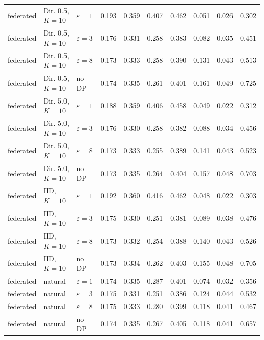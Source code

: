 {\begin{longtable}{lllrrrrrrr}
federated & Dir. 0.5, $K{=}10$ & $\varepsilon=1$ & 0.193 & 0.359 & 0.407 & 0.462 & 0.051 & 0.026 & 0.302 \\
federated & Dir. 0.5, $K{=}10$ & $\varepsilon=3$ & 0.176 & 0.331 & 0.258 & 0.383 & 0.082 & 0.035 & 0.451 \\
federated & Dir. 0.5, $K{=}10$ & $\varepsilon=8$ & 0.173 & 0.333 & 0.258 & 0.390 & 0.131 & 0.043 & 0.513 \\
federated & Dir. 0.5, $K{=}10$ & no DP & 0.174 & 0.335 & 0.261 & 0.401 & 0.161 & 0.049 & 0.725 \\
federated & Dir. 5.0, $K{=}10$ & $\varepsilon=1$ & 0.188 & 0.359 & 0.406 & 0.458 & 0.049 & 0.022 & 0.312 \\
federated & Dir. 5.0, $K{=}10$ & $\varepsilon=3$ & 0.176 & 0.330 & 0.258 & 0.382 & 0.088 & 0.034 & 0.456 \\
federated & Dir. 5.0, $K{=}10$ & $\varepsilon=8$ & 0.173 & 0.333 & 0.255 & 0.389 & 0.141 & 0.043 & 0.523 \\
federated & Dir. 5.0, $K{=}10$ & no DP & 0.173 & 0.335 & 0.264 & 0.404 & 0.157 & 0.048 & 0.703 \\
federated & IID, $K{=}10$ & $\varepsilon=1$ & 0.192 & 0.360 & 0.416 & 0.462 & 0.048 & 0.022 & 0.303 \\
federated & IID, $K{=}10$ & $\varepsilon=3$ & 0.175 & 0.330 & 0.251 & 0.381 & 0.089 & 0.038 & 0.476 \\
federated & IID, $K{=}10$ & $\varepsilon=8$ & 0.173 & 0.332 & 0.254 & 0.388 & 0.140 & 0.043 & 0.526 \\
federated & IID, $K{=}10$ & no DP & 0.173 & 0.334 & 0.262 & 0.403 & 0.155 & 0.048 & 0.705 \\
federated & natural & $\varepsilon=1$ & 0.174 & 0.335 & 0.287 & 0.401 & 0.074 & 0.032 & 0.356 \\
federated & natural & $\varepsilon=3$ & 0.175 & 0.331 & 0.251 & 0.386 & 0.124 & 0.044 & 0.532 \\
federated & natural & $\varepsilon=8$ & 0.175 & 0.333 & 0.280 & 0.399 & 0.118 & 0.041 & 0.467 \\
federated & natural & no DP & 0.174 & 0.335 & 0.267 & 0.405 & 0.118 & 0.041 & 0.657 \\
\end{longtable}}


